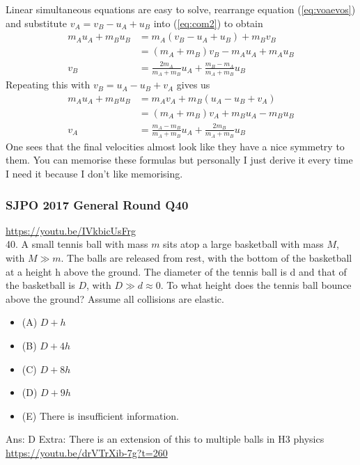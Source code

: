 \documentclass{article}
\begin{document}
Linear simultaneous equations are easy to solve, rearrange equation (\ref{eq:voaevos}) and substitute $v_A = v_B - u_A + u_B$ into (\ref{eq:com2}) to obtain
\begin{align}
    m_A u_A + m_B u_B &= m_A (v_B - u_A + u_B) + m_B v_B \\
    &= (m_A + m_B) v_B - m_A u_A + m_A u_B \\
    v_B &= \frac{2m_A}{m_A + m_B} u_A + \frac{m_B - m_A}{m_A + m_B} u_B 
\end{align}
Repeating this with $v_B = u_A - u_B + v_A$ gives us 
\begin{align}
    m_A u_A + m_B u_B &= m_A v_A + m_B (u_A - u_B + v_A) \\
    &= (m_A + m_B) v_A + m_B u_A - m_B u_B \\
    v_A &= \frac{m_A - m_B}{m_A + m_B} u_A + \frac{2m_B}{m_A + m_B} u_B
\end{align}
One sees that the final velocities almost look like they have a nice symmetry to them. You can memorise these formulas but personally I just derive it every time I need it because I don't like memorising.
\subsubsection{SJPO 2017 General Round Q40}
\url{https://youtu.be/IVkbicUsFrg}\\
40. A small tennis ball with mass $m$ sits atop a large basketball with mass $M$, with $M \gg m$. The balls are released from rest, with the bottom of the basketball at a height $\mathrm{h}$ above the ground. The diameter of the tennis ball is d and that of the basketball is $D$, with $D \gg d \approx 0$. To what height does the tennis ball bounce above the ground? Assume all collisions are elastic.
\begin{itemize}
\item[] (A) $D+h$
\item[] (B) $D+4 h$
\item[] (C) $D+8 h$
\item[] (D) $D+9 h$
\item[] (E) There is insufficient information.
\end{itemize}
Ans: \ifpaper D \fi
Extra: There is an extension of this to multiple balls in H3 physics \url{https://youtu.be/drVTrXib-7g?t=260}
\end{document}
